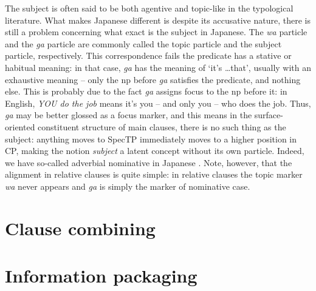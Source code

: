 \documentclass[UTF8, a4paper, oneside, scheme=plain]{ctexart}
\newcommand*{\citesec}[1]{\S~{#1}}
\newcommand*{\term}[1]{\emph{#1}}
\newcommand{\corpus}[1]{\emph{#1}}
\newcommand{\translate}[1]{`#1'}
\begin{document}
The subject is often said to be both agentive and topic-like in the typological literature.
What makes Japanese different is despite its accusative nature,
there is still a problem concerning what exact is the subject in Japanese.
The \corpus{wa} particle and the \corpus{ga} particle are commonly called 
the topic particle and the subject particle, respectively.
This correspondence fails the predicate has a stative or habitual meaning:
in that case, \corpus{ga} has the meaning of \translate{it's \dots that},
usually with an exhaustive meaning -- 
only the \ac{np} before \corpus{ga} satisfies the predicate,
and nothing else.
This is probably due to the fact \corpus{ga} assigns focus to the \ac{np} before it:
in English, \corpus{YOU do the job} means it's you -- and only you -- who does the job.
Thus, \corpus{ga} may be better glossed as a focus marker,
and this means in the surface-oriented constituent structure of main clauses, 
there is no such thing as the subject: 
anything moves to SpecTP immediately moves to a higher position in CP, 
making the notion \term{subject} a latent concept without its own particle.
Indeed, we have so-called adverbial nominative in Japanese \citet[\citesec{6.1}]{endo2007locality}.
Note, however, that the alignment in relative clauses is quite simple:
in relative clauses the topic marker \corpus{wa} never appears 
and \corpus{ga} is simply the marker of nominative case.

\section{Clause combining}

\section{Information packaging}




\end{document}
